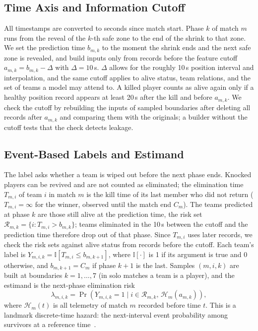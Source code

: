 \documentclass[sigconf,anonymous,nonacm]{acmart}
\begin{document}
\subsection{Time Axis and Information Cutoff}
All timestamps are converted to seconds since match start.
Phase $k$ of match $m$ runs from the reveal of the $k$-th safe zone to the end of the shrink to that zone.
We set the prediction time $b_{m,k}$ to the moment the shrink ends and the next safe zone is revealed, and build inputs only from records before the feature cutoff $a_{m,k}=b_{m,k}-\Delta$ with $\Delta=10$\,s.
$\Delta$ allows for the roughly 10\,s position interval and interpolation, and the same cutoff applies to alive status, team relations, and the set of teams a model may attend to.
A killed player counts as alive again only if a healthy position record appears at least 20\,s after the kill and before $a_{m,k}$.
We check the cutoff by rebuilding the inputs of sampled boundaries after deleting all records after $a_{m,k}$ and comparing them with the originals; a builder without the cutoff tests that the check detects leakage.

\subsection{Event-Based Labels and Estimand}
The label asks whether a team is wiped out before the next phase ends.
Knocked players can be revived and are not counted as eliminated; the elimination time $T_{m,i}$ of team $i$ in match $m$ is the kill time of its last member who did not return ($T_{m,i}=\infty$ for the winner, observed until the match end $C_m$).
The teams predicted at phase $k$ are those still alive at the prediction time, the risk set $\mathcal{R}_{m,k}=\{i: T_{m,i}>b_{m,k}\}$; teams eliminated in the 10\,s between the cutoff and the prediction time therefore drop out of that phase. Since $T_{m,i}$ uses later records, we check the risk sets against alive status from records before the cutoff.
Each team's label is $Y_{m,i,k}=\mathbb{I}[T_{m,i}\le b_{m,k+1}]$, where $\mathbb{I}[\cdot]$ is 1 if its argument is true and 0 otherwise, and $b_{m,k+1}=C_m$ if phase $k+1$ is the last.
Samples $(m,i,k)$ are built at boundaries $k=1,\dots,7$ (in solo matches a team is a player), and the estimand is the next-phase elimination risk
\begin{equation}
\lambda_{m,i,k}=\Pr\!\left(Y_{m,i,k}=1 \mid i\in\mathcal{R}_{m,k},\,\mathcal{H}_{m}(a_{m,k})\right),
\label{eq:hazard}
\end{equation}
where $\mathcal{H}_{m}(t)$ is all telemetry of match $m$ recorded before time $t$.
This is a landmark discrete-time hazard: the next-interval event probability among survivors at a reference time~\cite{vanHouwelingen07}.
\end{document}
